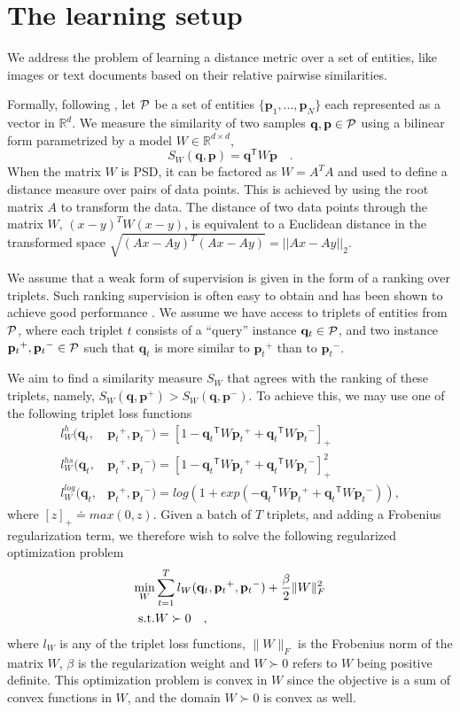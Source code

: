 \documentclass{article} %
\newcommand\mat[1]{{#1}}
\renewcommand\vec[1]{\mathbf{#1}}
\newcommand{\T}{{}^\mathsf{T}}
\newcommand{\W}{\mat{W}}
\newcommand{\eqdef}{\doteq}
\newcommand{\Rd}{\mathbb{R}^d}
\newcommand{\frobsq}[1]{{\|#1\|_F^2}}
\newcommand{\frob}[1]{{\|#1\|_F}}
\newcommand{\q}{{\vec{q}}}
\newcommand{\p}{{\vec{p}}}
\newcommand{\trip}{{t}}
\newcommand{\qt}{{\q_{\trip}}}
\newcommand{\pt}{{\p_{\trip}}}
\begin{document}
\section{The learning setup}
We address the problem of learning a distance metric over a set of
entities, like images or text documents based on their
relative pairwise similarities.

Formally, following \citet{OASIS}, let $\cal{P}$ be a set of entities $\{\p_1,...,\p_N\}$ each represented as a vector in $\Rd$. We measure the similarity of two samples $\q, \p \in \cal{P}$ using a bilinear
form parametrized by a model $\W \in \mathbb{R}^{d \times d}$,
\begin{equation}
  S_{\W}(\q, \p) = \q\T \W \p \quad.
\end{equation}
When the matrix $\W$ is PSD, it can be factored as $\W = A^TA$ and used to define a distance measure over pairs of data points. This is achieved by using the root matrix $A$ to transform the data. The distance of two data points through the matrix $\W$, $(x-y)^T\W(x-y)$, is equivalent to a Euclidean distance in the transformed space $\sqrt{(Ax-Ay)^T(Ax-Ay)} = ||Ax-Ay||_2$. 

We assume that a weak form of supervision is given in the form of a ranking over triplets. Such ranking supervision is often easy to obtain and has been shown to achieve good performance \cite{weinberger2006dml,OASIS,qian}. We assume we have access to triplets of entities from $\cal{P}$, where each triplet $t$ consists of
a ``query'' instance $\qt \in \cal{P}$, and two instance $\pt^{+}, \pt^{-} \in \cal{P}$ such that $\qt$ is more similar to $\pt^{+}$
than to $\pt^{-}$.

We aim to find a similarity measure $S_{\W}$ that agrees with the ranking of these triplets, namely, $S_{\W}(\q, \p^{+}) > S_{\W}(\q,
\p^{-})$. To achieve this, we may use one of the following triplet loss functions
\begin{align}
\label{single-triplet-lossed}
l_{\W}^h(\qt, &\pt^{+}, \pt^{-}) = [1-\qt\T\W\pt^+ + \qt\T\W\pt^-]_{+}
 \\ \nonumber
l_{\W}^{hs}(\qt, &\pt^+, \pt^-) = [1-\qt\T\W\pt^+ + \qt\T\W\pt^-]_{+}^2
 \\ \nonumber
l_{\W}^{log}(\qt, &\pt^+, \pt^-) = log(1+exp(-\qt\T\W\pt^+ + \qt\T\W\pt^-)) \nonumber ,
\end{align}
where $[z]_{+} \eqdef max(0,z)$. Given a batch of $T$ triplets, and adding a Frobenius regularization term, we therefore wish to solve the following regularized optimization problem
\begin{eqnarray}
  \min_{\W}& \sum_{\trip=1}^T  l_{\W}(\qt, \pt^+, \pt^-) + \frac{\beta}{2} \frobsq{\W}
 \\  \nonumber
   \rm{s.t.}& \W \succ 0 \quad,
\label{hingelt}
\end{eqnarray}
where $l_{\W}$ is any of the triplet loss functions, $\frob{\W}$ is the Frobenius norm of the matrix $\W$, $\beta$ is the regularization weight and $\W \succ 0$ refers to $\W$ being positive definite. This optimization problem is convex in $\W$ since the objective is a sum of convex functions in $\W$, and the domain $\W \succ 0$ is convex as well.
\end{document}
